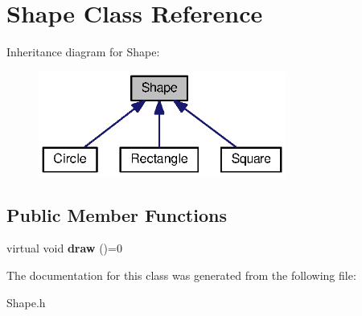 \section{Shape Class Reference}
\label{class_shape}


Inheritance diagram for Shape\-:
\nopagebreak
\begin{figure}[H]
\begin{center}
\leavevmode
\includegraphics[width=230pt]{class_shape__inherit__graph}
\end{center}
\end{figure}
\subsection*{Public Member Functions}
\begin{DoxyCompactItemize}
\item 
virtual void {\bfseries draw} ()=0\label{class_shape_afacc5aad8e37308c3ce8fef768199b05}

\end{DoxyCompactItemize}


The documentation for this class was generated from the following file\-:\begin{DoxyCompactItemize}
\item 
Shape.\-h\end{DoxyCompactItemize}
